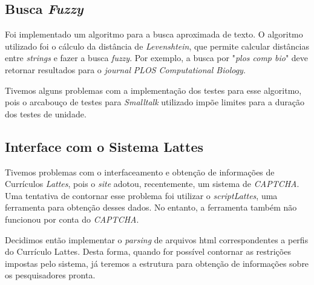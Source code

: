 \documentclass[12pt]{article}
\begin{document}
\subsection{Busca \emph{Fuzzy}}

Foi implementado um algoritmo para a busca aproximada de texto.
O algoritmo utilizado foi o cálculo da distância de \emph{Levenshtein},
que permite calcular distâncias entre \emph{strings} e fazer a busca
\emph{fuzzy}. Por exemplo, a busca por "\emph{plos comp bio}" deve retornar
resultados para o \emph{journal} \emph{PLOS Computational Biology}.

Tivemos alguns problemas com a implementação dos testes para esse algoritmo,
pois o arcabouço de testes para \emph{Smalltalk} utilizado impõe limites
para a duração dos testes de unidade.

\subsection{Interface com o Sistema Lattes}

Tivemos problemas com o interfaceamento e obtenção de informações
de Currículos \emph{Lattes}, pois o \emph{site} adotou, recentemente,
um sistema de \emph{CAPTCHA}. Uma tentativa de contornar esse problema
foi utilizar o \emph{scriptLattes}, uma ferramenta para obtenção desses dados.
No entanto, a ferramenta também não funcionou por conta do \emph{CAPTCHA}.

Decidimos então implementar o \emph{parsing} de arquivos html correspondentes
a perfis do Currículo Lattes. Desta forma, quando for possível contornar as
restrições impostas pelo sistema, já teremos a estrutura para obtenção de 
informações sobre os pesquisadores pronta.
\end{document}
